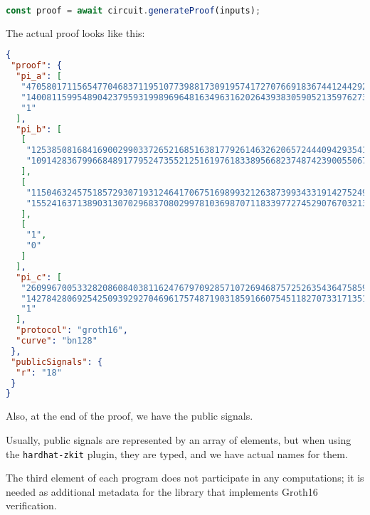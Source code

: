 \documentclass[../lecture-notes.tex]{subfiles}
\begin{document}
    \begin{lstlisting}[language=TypeScript,numbers=none]
    const proof = await circuit.generateProof(inputs);
    \end{lstlisting}

    The actual proof looks like this:
    \begin{center}
        \begin{tcolorbox}[enhanced,
            width=0.925\textwidth,
            title=\textbf{proof.json},
            coltitle=gray!25!black,
            attach boxed title to top center={yshift=-2mm,yshifttext=-1mm},
            boxed title style={size=small,colframe=gray!75!black,
            colback=purple!30!white,boxrule=1pt},
            top=-0.35cm,
            bottom=-0.35cm]
            \begin{lstlisting}[language=JSON,numbers=none,basicstyle=\ttfamily\scriptsize]
{
 "proof": {
  "pi_a": [
   "4705801711565477046837119510773988173091957417270766918367441244292047980064",
   "1400811599548904237959319989696481634963162026439383059052135976273120564167",
   "1"
  ],
  "pi_b": [
   [
    "12538508168416900299033726521685163817792614632620657244409429354131980454661",
    "10914283679966848917795247355212516197618338956682374874239005506750384424444"
   ],
   [
    "11504632457518572930719312464170675169899321263873993433191427524966381618623",
    "15524163713890313070296837080299781036987071183397727452907670321368057103914"
   ],
   [
    "1",
    "0"
   ]
  ],
  "pi_c": [
   "260996700533282086084038116247679709285710726946875725263543647585988798998",
   "14278428069254250939292704696175748719031859166075451182707331713513969403299",
   "1"
  ],
  "protocol": "groth16",
  "curve": "bn128"
 },
 "publicSignals": {
  "r": "18"
 }
}
            \end{lstlisting}
        \end{tcolorbox}
    \end{center}

    \vspace{0.5cm}

    Also, at the end of the proof, we have the public signals.

    \begin{remark}
        Usually, public signals are represented by an array of elements, but when using the \texttt{hardhat-zkit} plugin,
        they are typed, and we have actual names for them.
    \end{remark}

    The third element of each program does not participate in any computations; it is needed as additional metadata for the library that implements Groth16 verification.
\end{document}
